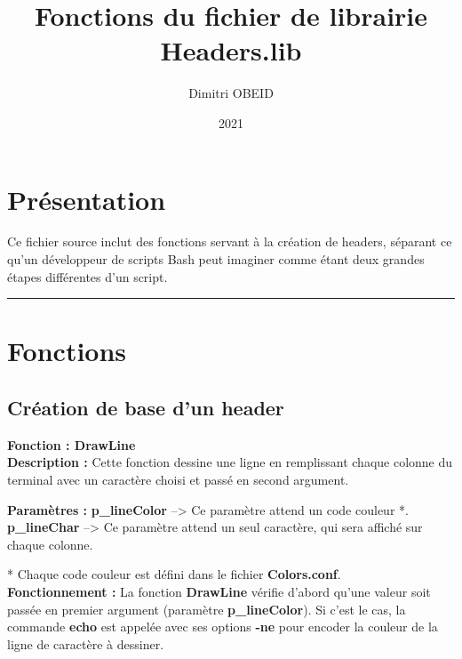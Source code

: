 \documentclass[a4paper,10pt]{article}
\title{\color{red}Fonctions du fichier de librairie \color{lime}Headers.lib}\color{white}
\author{Dimitri OBEID}
\date{2021}
\begin{document}
 \maketitle
 \tableofcontents
 \newpage

\color{red}
\section{Présentation}\color{white}
Ce fichier source inclut des fonctions servant à la création de headers, séparant ce qu'un développeur de scripts Bash peut imaginer comme étant deux grandes étapes différentes d'un script.\\[1\baselineskip]


\color{red}\par\noindent\rule{\textwidth}{0.4pt}\color{white}

\color{red}
\section{Fonctions}\color{white}

\color{green}
\subsection{Création de base d'un header}\color{white}

\textbf{Fonction : \color{mauve}DrawLine\color{white}}\\[1\baselineskip]
\textbf{Description :}\linebreak
Cette fonction dessine une ligne en remplissant chaque colonne du terminal avec un caractère choisi et passé en second argument.\linebreak

\textbf{Paramètres :}\linebreak
\textbf{\color{orange}p\_lineColor\color{white}} --> Ce paramètre attend un code couleur *.\linebreak
\textbf{\color{orange}p\_lineChar\color{white}} --> Ce paramètre attend un seul caractère, qui sera affiché sur chaque colonne.\linebreak

* Chaque code couleur est défini dans le fichier \textbf{\color{lime}Colors.conf\color{white}}.\\[1\baselineskip]

\textbf{Fonctionnement :}\linebreak
La fonction \textbf{\color{mauve}DrawLine\color{white}} vérifie d'abord qu'une valeur soit passée en premier argument (paramètre \textbf{\color{orange}p\_lineColor\color{white}}). Si c'est le cas, la commande \textbf{\color{gray}echo\color{white}} est appelée avec ses options \textbf{\color{gray}-ne\color{white}} pour encoder la couleur de la ligne de caractère à dessiner.\\[1\baselineskip]
\end{document}
